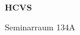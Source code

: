 \documentclass[a4paper]{article}
\begin{document}
\printGenericVSLHeader
\begin{center}
\begin{vsltext}{3cm}{4cm}

   \vspace{0.5cm} 

    \textbf{HCVS} 

    \vspace{1.5cm}

    Seminarraum 134A

\end{vsltext}

\end{center}
\end{document}
